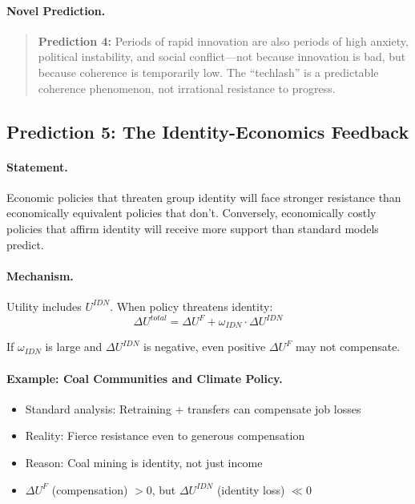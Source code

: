 \paragraph{Novel Prediction.}
\begin{quote}
\textbf{Prediction 4:} Periods of rapid innovation are also periods of
high anxiety, political instability, and social conflict---not because
innovation is bad, but because coherence is temporarily low.
The ``techlash'' is a predictable coherence phenomenon, not irrational
resistance to progress.
\end{quote}

\subsection{Prediction 5: The Identity-Economics Feedback}

\paragraph{Statement.}
Economic policies that threaten group identity will face stronger
resistance than economically equivalent policies that don't.
Conversely, economically costly policies that affirm identity
will receive more support than standard models predict.

\paragraph{Mechanism.}
Utility includes $U^{IDN}$. When policy threatens identity:
\begin{equation}
  \Delta U^{total} = \Delta U^F + \omega_{IDN} \cdot \Delta U^{IDN}
\end{equation}

If $\omega_{IDN}$ is large and $\Delta U^{IDN}$ is negative,
even positive $\Delta U^F$ may not compensate.

\paragraph{Example: Coal Communities and Climate Policy.}
\begin{itemize}
  \item Standard analysis: Retraining + transfers can compensate job losses
  \item Reality: Fierce resistance even to generous compensation
  \item Reason: Coal mining is identity, not just income
  \item $\Delta U^F$ (compensation) $> 0$, but $\Delta U^{IDN}$ (identity loss) $\ll 0$
\end{itemize}

